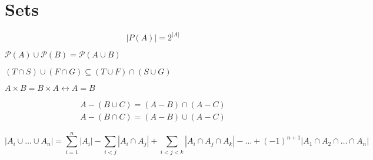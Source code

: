 \section{Sets}
\begin{theorem}
	$$
	|P(A)| = 2^{|A|}
	$$
\end{theorem}

\begin{theorem}
	$\mathcal{P}(A) \cup \mathcal{P}(B) = \mathcal{P}(A \cup B)$
\end{theorem}

\begin{theorem}
	$(T\cap S)\cup (F\cap G) \subseteq (T\cup F)\cap (S\cup G)$
\end{theorem}

\begin{theorem}
	$A\times B = B\times A \leftrightarrow A=B$
\end{theorem}

\begin{theorem}
	\begin{equation*}
		\begin{split}
			A-(B\cup C) = (A-B)\cap (A-C)\\
			A-(B\cap C) = (A-B)\cup (A-C)
		\end{split}
	\end{equation*}
\end{theorem}

\begin{theorem}
	$$
	|A_i\cup \hdots\cup A_n| = \sum_{i=1}^n |A_i| - \sum_{i<j} |A_i \cap A_j| + \sum_{i<j<k} |A_i \cap A_j \cap A_k| - \hdots + (-1)^{n+1} |A_1 \cap A_2 \cap \hdots \cap A_n|
	$$
\end{theorem}
